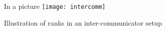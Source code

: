 \begin{frame}{In a picture}
\label{sl:intercomm-picture}
\texttt{[image: intercomm]}

Illustration of ranks in an inter-communicator setup
\tiny{}
\end{frame}
